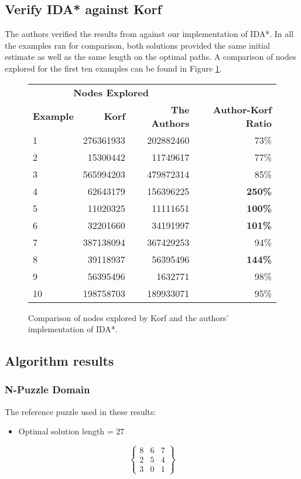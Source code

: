 \documentclass{article}
\begin{document}
\subsection{Verify IDA* against Korf}
The authors verified the results from \cite{Korf1985} against our implementation of IDA*. In all the examples ran for comparison, both solutions provided the same initial estimate  as well as the same length on the optimal paths. A comparison of nodes explored for the first ten examples can be found in Figure \ref{table:korf_comparison_nodes}. \\
\begin{figure}[]
    \centering
    
\begin{tabular}{@{}lrrr@{}} \toprule
\multicolumn{3}{c}{\textbf{Nodes Explored}} \\ \cmidrule(r){2-3}
\textbf{Example} & \textbf{Korf} & \textbf{The Authors} & \textbf{Author-Korf Ratio} \\ \midrule
1 & 276361933 & 202882460 & 73\%\\
2 & 15300442 & 11749617 & 77\% \\
3 &565994203 & 479872314 & 85\% \\
4&62643179 & 156396225  & \textbf{250\%} \\ 
5&11020325&11111651 & \textbf{100\%}\\
6&32201660&34191997 & \textbf{101\%}\\
7&387138094&367429253& 94\%\\
8&39118937&56395496 & \textbf{144\%}\\
9&56395496&1632771 & 98\%\\
10&198758703 &189933071 & 95\% \\\bottomrule
\end{tabular}
    \caption{Comparison of nodes explored by Korf and the authors' implementation of IDA*.}
    \label{table:korf_comparison_nodes}
\end{figure}


\subsection{Algorithm results}

\subsubsection{N-Puzzle Domain}
The reference puzzle used in these results:
\begin{itemize}
    \item Optimal solution length = $27$
\end{itemize}
\begin{equation}
\begin{Bmatrix}
8 & 6 & 7 \\
2 & 5 & 4 \\
3 & 0 & 1
\end{Bmatrix}
\end{equation}
\end{document}
